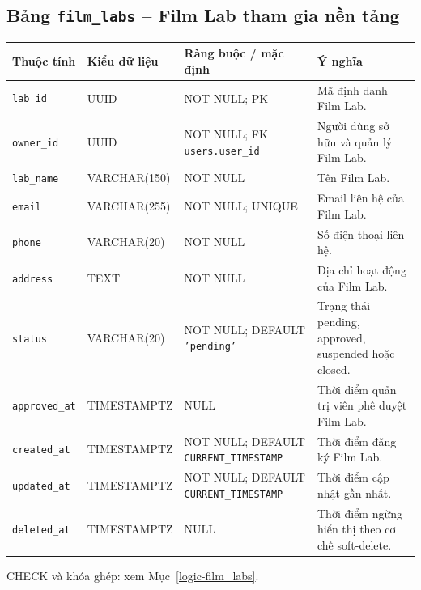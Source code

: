 \subsection{Bảng \texttt{film\_\allowbreak{}labs} -- Film Lab tham gia nền tảng}
\label{dictionary-film_labs}
\begingroup
\footnotesize
\setlength{\tabcolsep}{3pt}
\begin{longtable}{>{\raggedright\arraybackslash}p{3.1cm}>{\raggedright\arraybackslash}p{2.5cm}>{\raggedright\arraybackslash}p{3.7cm}>{\raggedright\arraybackslash}p{4.3cm}}
\toprule
Thuộc tính & Kiểu dữ liệu & Ràng buộc / mặc định & Ý nghĩa \\
\midrule
\endhead
\texttt{lab\_\allowbreak{}id} & UUID & NOT NULL; PK & Mã định danh Film Lab. \\
\texttt{owner\_\allowbreak{}id} & UUID & NOT NULL; FK \texttt{users.user\_\allowbreak{}id} & Người dùng sở hữu và quản lý Film Lab. \\
\texttt{lab\_\allowbreak{}name} & VARCHAR(150) & NOT NULL & Tên Film Lab. \\
\texttt{email} & VARCHAR(255) & NOT NULL; UNIQUE & Email liên hệ của Film Lab. \\
\texttt{phone} & VARCHAR(20) & NOT NULL & Số điện thoại liên hệ. \\
\texttt{address} & TEXT & NOT NULL & Địa chỉ hoạt động của Film Lab. \\
\texttt{status} & VARCHAR(20) & NOT NULL; DEFAULT \texttt{'pending'} & Trạng thái pending, approved, suspended hoặc closed. \\
\texttt{approved\_\allowbreak{}at} & TIMESTAMPTZ & NULL & Thời điểm quản trị viên phê duyệt Film Lab. \\
\texttt{created\_\allowbreak{}at} & TIMESTAMPTZ & NOT NULL; DEFAULT \texttt{CURRENT\_\allowbreak{}TIMESTAMP} & Thời điểm đăng ký Film Lab. \\
\texttt{updated\_\allowbreak{}at} & TIMESTAMPTZ & NOT NULL; DEFAULT \texttt{CURRENT\_\allowbreak{}TIMESTAMP} & Thời điểm cập nhật gần nhất. \\
\texttt{deleted\_\allowbreak{}at} & TIMESTAMPTZ & NULL & Thời điểm ngừng hiển thị theo cơ chế soft-delete. \\
\bottomrule
\end{longtable}
\endgroup
CHECK và khóa ghép: xem Mục~\ref{logic-film_labs}.
